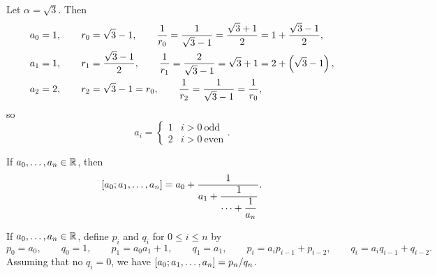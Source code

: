 \begin{example*}
Let $ \alpha = \sqrt{3} $. Then
\begin{align*}
& a_0 = 1, \qquad r_0 = \sqrt{3} - 1, \qquad \dfrac{1}{r_0} = \dfrac{1}{\sqrt{3} - 1} = \dfrac{\sqrt{3} + 1}{2} = 1 + \dfrac{\sqrt{3} - 1}{2}, \\
& a_1 = 1, \qquad r_1 = \dfrac{\sqrt{3} - 1}{2}, \qquad \dfrac{1}{r_1} = \dfrac{2}{\sqrt{3} - 1} = \sqrt{3} + 1 = 2 + \br{\sqrt{3} - 1}, \\
& a_2 = 2, \qquad r_2 = \sqrt{3} - 1 = r_0, \qquad \dfrac{1}{r_2} = \dfrac{1}{\sqrt{3} - 1} = \dfrac{1}{r_0},
\end{align*}
so
$$ a_i =
\begin{cases}
1 & i > 0 \ \text{odd} \\
2 & i > 0 \ \text{even}
\end{cases}.
$$
\end{example*}

If $ a_0, \dots, a_n \in \mathbb{R} $, then
$$ \sbr{a_0; a_1, \dots, a_n} = a_0 + \dfrac{1}{a_1 + \dfrac{1}{\dots + \dfrac{1}{a_n}}}. $$

\pagebreak

\begin{lemma}
\label{lem:68}
If $ a_0, \dots, a_n \in \mathbb{R} $, define $ p_i $ and $ q_i $ for $ 0 \le i \le n $ by
$$ p_0 = a_0, \qquad q_0 = 1, \qquad p_1 = a_0a_1 + 1, \qquad q_1 = a_1, \qquad p_i = a_ip_{i - 1} + p_{i - 2}, \qquad q_i = a_iq_{i - 1} + q_{i - 2}. $$
Assuming that no $ q_i = 0 $, we have $ \sbr{a_0; a_1, \dots, a_n} = p_n / q_n $.
\end{lemma}

